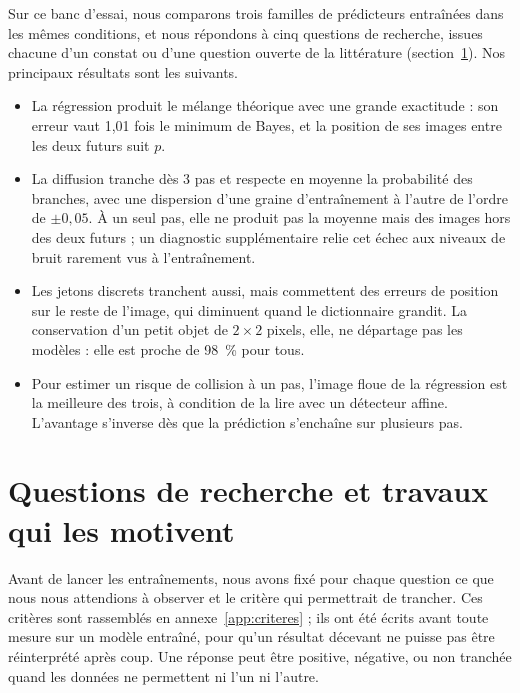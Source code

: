 \documentclass[a4paper, 11pt]{article}
\begin{document}
Sur ce banc d'essai, nous comparons trois familles de prédicteurs entraînées dans les mêmes conditions, et nous
répondons à cinq questions de recherche, issues chacune d'un constat ou d'une question ouverte de la littérature
(section~\ref{sec:questions}). Nos principaux résultats sont les suivants.

\begin{itemize}
  \item La régression produit le mélange théorique avec une grande exactitude : son erreur vaut 1,01 fois le minimum de
  Bayes, et la position de ses images entre les deux futurs suit $p$.
  \item La diffusion tranche dès 3 pas et respecte en moyenne la probabilité des branches, avec une dispersion d'une
  graine d'entraînement à l'autre de l'ordre de $\pm 0{,}05$. À un seul pas, elle ne produit pas la moyenne mais des images
  hors des deux futurs ; un diagnostic supplémentaire relie cet échec aux niveaux de bruit rarement vus à l'entraînement.
  \item Les jetons discrets tranchent aussi, mais commettent des erreurs de position sur le reste de l'image, qui diminuent
  quand le dictionnaire grandit. La conservation d'un petit objet de $2\times2$ pixels, elle, ne départage pas les
  modèles : elle est proche de 98~\% pour tous.
  \item Pour estimer un risque de collision à un pas, l'image floue de la régression est la meilleure des trois, à
  condition de la lire avec un détecteur affine. L'avantage s'inverse dès que la prédiction s'enchaîne sur plusieurs pas.
\end{itemize}

\section{Questions de recherche et travaux qui les motivent}\label{sec:questions}

Avant de lancer les entraînements, nous avons fixé pour chaque question ce que nous nous attendions à observer et le
critère qui permettrait de trancher. Ces critères sont rassemblés en annexe~\ref{app:criteres} ; ils ont été écrits avant
toute mesure sur un modèle entraîné, pour qu'un résultat décevant ne puisse pas être réinterprété après coup. Une
réponse peut être positive, négative, ou non tranchée quand les données ne permettent ni l'un ni l'autre.
\end{document}
